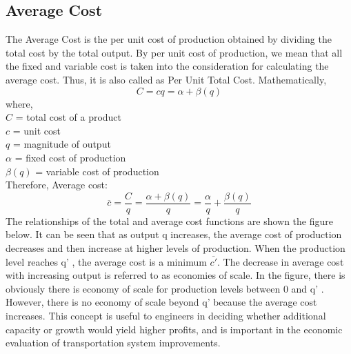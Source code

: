 \subsection{Average Cost}
The Average Cost is the per unit cost of production obtained by dividing the total cost by the total output. By per unit cost of production, we mean that all the fixed and variable cost is taken into the consideration for calculating the average cost. Thus, it is also called as Per Unit Total Cost. Mathematically,
\begin{equation}
	C = cq = \alpha + \beta (q)
\end{equation}
where,\\
\hspace*{10mm}$C$ = total cost of a product\\
\hspace*{10mm}$c$ = unit cost\\
\hspace*{10mm}$q$ = magnitude of output\\
\hspace*{10mm}$\alpha$ = fixed cost of production\\
\hspace*{10mm}$\beta(q)$ = variable cost of production\\
Therefore, Average cost:
\begin{equation}
	\overline{c} = \frac{C}{q} = \frac{\alpha + \beta (q)}{q} = \frac{\alpha}{q} + \frac{\beta (q)}{q}
\end{equation}
The relationships of the total and average cost functions are shown the figure below. It can be seen that as output q increases, the average cost of production decreases and then increase at higher levels of production. When the production level reaches q' , the average cost is a minimum $\overline{c'}$. The decrease in average cost with increasing output is referred to as economies of scale. In the figure, there is obviously there is economy of scale for production levels between 0 and q' . However, there is no economy of scale beyond q' because the average cost increases. This concept is useful to engineers in deciding whether additional capacity or growth would yield higher profits, and is important in the economic evaluation of transportation system improvements.
